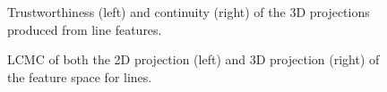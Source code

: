 \begin{figure}[H]
	\centering
	\caption{Trustworthiness (left) and continuity (right) of the 3D projections produced from line features.}\label{fig:TC_3d_lines}
\end{figure}

\begin{figure}[H]
	\centering
	\caption{LCMC of both the 2D projection (left) and 3D projection (right) of the feature space for lines.}\label{fig:LCMC_lines}
\end{figure}
\clearpage

